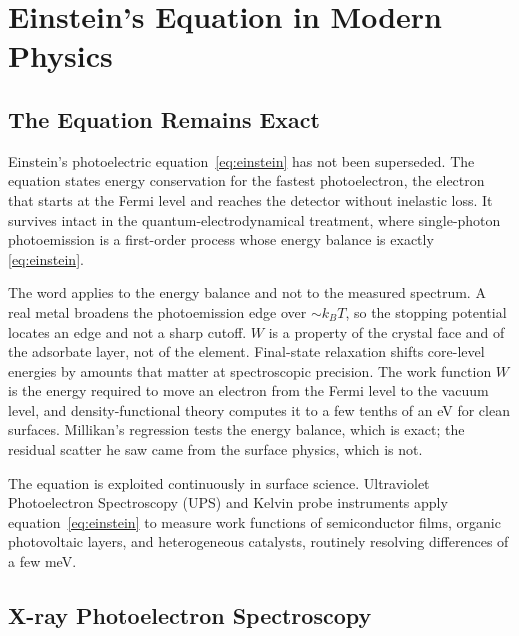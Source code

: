 \documentclass[12pt]{article}
\begin{document}
\appendix

\section{Einstein's Equation in Modern Physics}
\label{app:modern}

\subsection{The Equation Remains Exact}

Einstein's photoelectric equation~\eqref{eq:einstein} has not been
superseded.  The equation states energy conservation for the fastest
photoelectron, the electron that starts at the Fermi level and reaches the
detector without inelastic loss.  It survives intact in the
quantum-electrodynamical treatment, where single-photon photoemission is a
first-order process whose energy balance is exactly \eqref{eq:einstein}.

The word applies to the energy balance and not to the measured spectrum.  A
real metal broadens the photoemission edge over $\sim k_BT$, so the stopping
potential locates an edge and not a sharp cutoff.  $W$ is a property of the
crystal face and of the adsorbate layer, not of the element.  Final-state
relaxation shifts core-level energies by amounts that matter at spectroscopic
precision.  The
work function $W$ is the energy required to move an electron from the Fermi
level to the vacuum level, and density-functional theory computes it to a few
tenths of an eV for clean surfaces.  Millikan's regression tests the energy
balance, which is exact; the residual scatter he saw came from the surface
physics, which is not.

The equation is exploited continuously in surface science.  Ultraviolet
Photoelectron Spectroscopy (UPS) and Kelvin probe instruments apply
equation~\eqref{eq:einstein} to measure work functions
of semiconductor films, organic photovoltaic layers, and heterogeneous
catalysts, routinely resolving differences of a few meV.

\subsection{X-ray Photoelectron Spectroscopy}
\label{app:xps}
\end{document}
